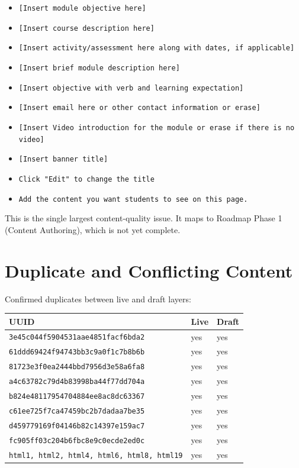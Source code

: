 \begin{itemize}
  \item \texttt{[Insert module objective here]}
  \item \texttt{[Insert course description here]}
  \item \texttt{[Insert activity/assessment here along with dates, if applicable]}
  \item \texttt{[Insert brief module description here]}
  \item \texttt{[Insert objective with verb and learning expectation]}
  \item \texttt{[Insert email here or other contact information or erase]}
  \item \texttt{[Insert Video introduction for the module or erase if there is no video]}
  \item \texttt{[Insert banner title]}
  \item \texttt{Click "Edit" to change the title}
  \item \texttt{Add the content you want students to see on this page.}
\end{itemize}

This is the single largest content-quality issue. It maps to Roadmap
Phase 1 (Content Authoring), which is not yet complete.

\section{Duplicate and Conflicting Content}

Confirmed duplicates between live and draft layers:

\begin{table}[h]
\centering
\small
\begin{tabular}{@{}lll@{}}
\toprule
\textbf{UUID} & \textbf{Live} & \textbf{Draft} \\
\midrule
\texttt{3e45c044f5904531aae4851facf6bda2} & yes & yes \\
\texttt{61ddd69424f94743bb3c9a0f1c7b8b6b} & yes & yes \\
\texttt{81723e3f0ea2444bbd7956d3e58a6fa8} & yes & yes \\
\texttt{a4c63782c79d4b83998ba44f77dd704a} & yes & yes \\
\texttt{b824e48117954704884ee8ac8dc63367} & yes & yes \\
\texttt{c61ee725f7ca47459bc2b7dadaa7be35} & yes & yes \\
\texttt{d459779169f04146b82c14397e159ac7} & yes & yes \\
\texttt{fc905ff03c204b6fbc8e9c0ecde2ed0c} & yes & yes \\
\texttt{html1, html2, html4, html6, html8, html19} & yes & yes \\
\bottomrule
\end{tabular}
\end{table}

